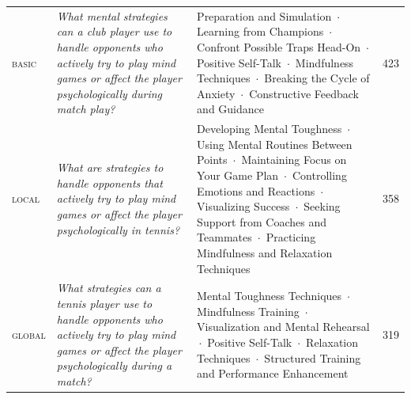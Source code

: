 {\begin{tabular}{@{}>{\raggedright\arraybackslash}p{}>{\raggedright\arraybackslash}p{}>{\raggedright\arraybackslash}p{}r@{}}
\addlinespace[3pt]
\textsc{basic} & \emph{What mental strategies can a club player use to handle opponents who actively try to play mind games or affect the player psychologically during match play?} & Preparation and Simulation \,$\cdot$\, Learning from Champions \,$\cdot$\, Confront Possible Traps Head-On \,$\cdot$\, Positive Self-Talk \,$\cdot$\, Mindfulness Techniques \,$\cdot$\, Breaking the Cycle of Anxiety \,$\cdot$\, Constructive Feedback and Guidance & 423 \\
\addlinespace[4pt]
\textsc{local} & \emph{What are strategies to handle opponents that actively try to play mind games or affect the player psychologically in tennis?} & Developing Mental Toughness \,$\cdot$\, Using Mental Routines Between Points \,$\cdot$\, Maintaining Focus on Your Game Plan \,$\cdot$\, Controlling Emotions and Reactions \,$\cdot$\, Visualizing Success \,$\cdot$\, Seeking Support from Coaches and Teammates \,$\cdot$\, Practicing Mindfulness and Relaxation Techniques & 358 \\
\addlinespace[4pt]
\textsc{global} & \emph{What strategies can a tennis player use to handle opponents who actively try to play mind games or affect the player psychologically during a match?} & Mental Toughness Techniques \,$\cdot$\, Mindfulness Training \,$\cdot$\, Visualization and Mental Rehearsal \,$\cdot$\, Positive Self-Talk \,$\cdot$\, Relaxation Techniques \,$\cdot$\, Structured Training and Performance Enhancement & 319 \\
\bottomrule
\end{tabular}}
